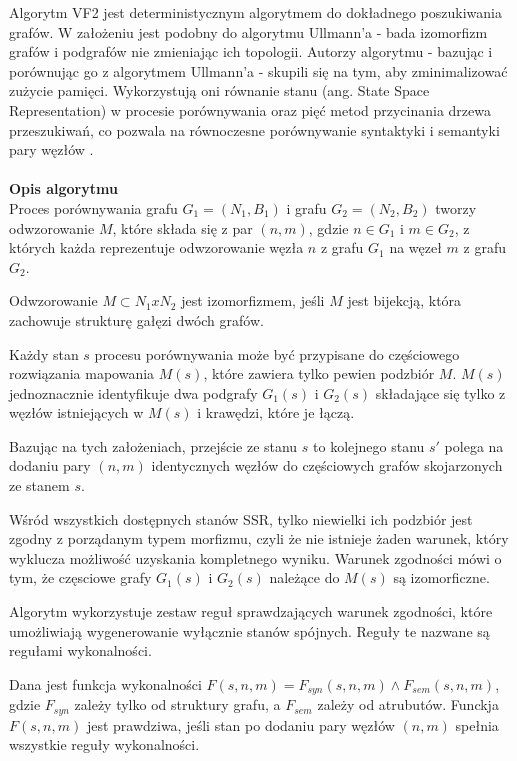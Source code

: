 \documentclass[a4paper,12pt,twoside]{article}
\begin{document}
Algorytm VF2 jest deterministycznym algorytmem do dokładnego poszukiwania grafów. W założeniu jest podobny do algorytmu Ullmann'a - bada izomorfizm grafów i podgrafów nie zmieniając ich topologii. Autorzy algorytmu - bazując i porównując go z algorytmem Ullmann'a - skupili się na tym, aby zminimalizować zużycie pamięci. Wykorzystują oni równanie stanu (ang. State Space Representation) w procesie porównywania oraz pięć metod przycinania drzewa przeszukiwań, co pozwala na równoczesne porównywanie syntaktyki i semantyki pary węzłów \cite{vf2}.
\\ \\
\textbf{Opis algorytmu}
\\
Proces porównywania grafu $G_1 = (N_1, B_1)$ i grafu $G_2 = (N_2, B_2)$ tworzy odwzorowanie $M$, które składa się z par $(n,m)$, gdzie $n \in G_1$ i $m \in G_2$, z których każda reprezentuje odwzorowanie węzła $n$ z grafu $G_1$ na węzeł $m$ z grafu $G_2$.

Odwzorowanie $M \subset N_1 x N_2$ jest izomorfizmem, jeśli $M$ jest bijekcją, która zachowuje strukturę gałęzi dwóch grafów.

Każdy stan $s$ procesu porównywania może być przypisane do częściowego rozwiązania mapowania $M(s)$, które zawiera tylko pewien podzbiór $M$. $M(s)$ jednoznacznie identyfikuje dwa podgrafy $G_1(s)$ i $G_2(s)$ składające się tylko z węzłów istniejących w $M(s)$ i krawędzi, które je łączą.

Bazując na tych założeniach, przejście ze stanu $s$ to kolejnego stanu $s'$ polega na dodaniu pary $(n,m)$ identycznych węzłów do częściowych grafów skojarzonych ze stanem $s$.

Wśród wszystkich dostępnych stanów SSR, tylko niewielki ich podzbiór jest zgodny z porządanym typem morfizmu, czyli że nie istnieje żaden warunek, który wyklucza możliwość uzyskania kompletnego wyniku.
Warunek zgodności mówi o tym, że częsciowe grafy $G_1(s)$ i $G_2(s)$ należące do $M(s)$ są izomorficzne.

Algorytm wykorzystuje zestaw reguł sprawdzających warunek zgodności, które umożliwiają wygenerowanie wyłącznie stanów spójnych. Reguły te nazwane są regułami wykonalności.

Dana jest funkcja wykonalności $F(s,n,m) = F_{syn}(s,n,m) \wedge F_{sem}(s,n,m)$, gdzie $F_{syn}$ zależy tylko od struktury grafu, a $F_{sem}$ zależy od atrubutów.
Funckja $F(s,n,m)$ jest prawdziwa, jeśli stan po dodaniu pary węzłów $(n,m)$ spełnia wszystkie reguły wykonalności.
\end{document}
